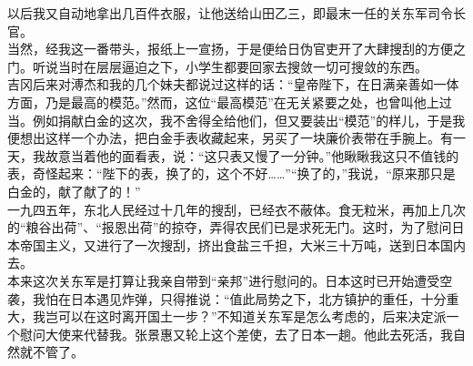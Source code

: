 以后我又自动地拿出几百件衣服，让他送给山田乙三，即最末一任的关东军司令长官。\\

当然，经我这一番带头，报纸上一宣扬，于是便给日伪官吏开了大肆搜刮的方便之门。听说当时在层层逼迫之下，小学生都要回家去搜敛一切可搜敛的东西。\\

吉冈后来对溥杰和我的几个妹夫都说过这样的话：“皇帝陛下，在日满亲善如一体方面，乃是最高的模范。”然而，这位“最高模范”在无关紧要之处，也曾叫他上过当。例如捐献白金的这次，我不舍得全给他们，但又要装出“模范”的样儿，于是我便想出这样一个办法，把白金手表收藏起来，另买了一块廉价表带在手腕上。有一天，我故意当着他的面看表，说：“这只表又慢了一分钟。”他瞅瞅我这只不值钱的表，奇怪起来：“陛下的表，换了的，这个不好……”“换了的，”我说，“原来那只是白金的，献了献了的！”\\

一九四五年，东北人民经过十几年的搜刮，已经衣不蔽体。食无粒米，再加上几次的“粮谷出荷”、“报恩出荷”的掠夺，弄得农民们已是求死无门。这时，为了慰问日本帝国主义，又进行了一次搜刮，挤出食盐三千担，大米三十万吨，送到日本国内去。\\

本来这次关东军是打算让我亲自带到“亲邦”进行慰问的。日本这时已开始遭受空袭，我怕在日本遇见炸弹，只得推说：“值此局势之下，北方镇护的重任，十分重大，我岂可以在这时离开国土一步？”不知道关东军是怎么考虑的，后来决定派一个慰问大使来代替我。张景惠又轮上这个差使，去了日本一趟。他此去死活，我自然就不管了。\\